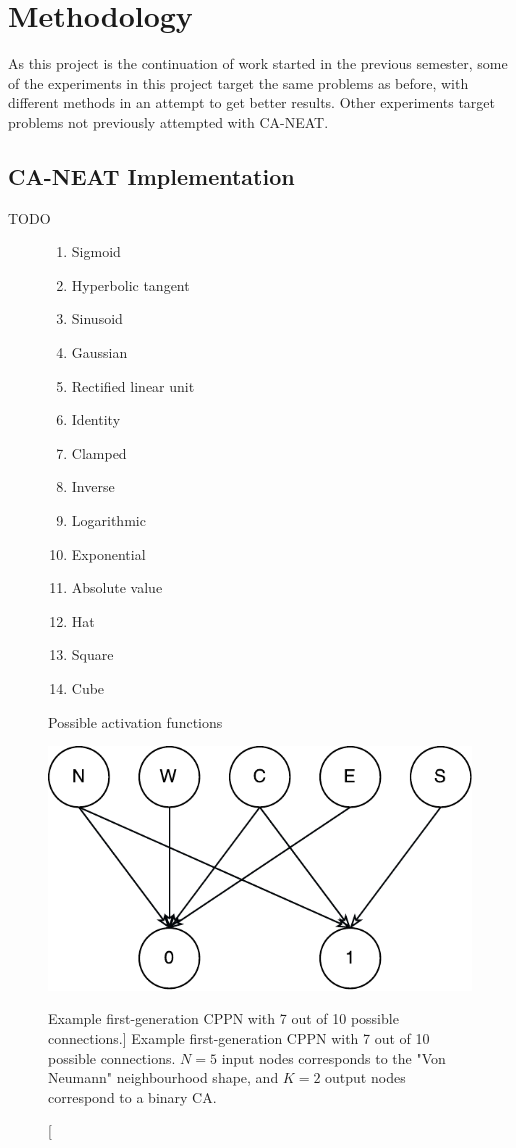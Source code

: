\chapter{Methodology}
\label{chap:methodology}

As this project is the continuation of work started in the previous semester,
some of the experiments in this project target the same problems as before,
with different methods in an attempt to get better results.
Other experiments target problems not previously attempted with CA-NEAT.

\section{CA-NEAT Implementation}
\label{sec:implementation}
TODO

\begin{figure}
\centering
\begin{multicols}{3}
\begin{enumerate}
    \item Sigmoid
    \item Hyperbolic tangent
    \item Sinusoid
    \item Gaussian
    \item Rectified linear unit
    \item Identity
    \item Clamped
    \item Inverse
    \item Logarithmic
    \item Exponential
    \item Absolute value
    \item Hat
    \item Square
    \item Cube
\end{enumerate}
\end{multicols}
\caption{Possible activation functions}
\label{fig:activations}
\end{figure}

\begin{figure}
\centering
\includegraphics[width=.5\columnwidth]{fig/single_layer_cppn}
\caption
[Example first-generation CPPN with 7 out of 10 possible connections.]
{Example first-generation CPPN with 7 out of 10 possible connections. $N=5$ input nodes corresponds to the "Von Neumann" neighbourhood shape, and $K=2$ output nodes correspond to a binary CA.}
\label{fig:single_layer_cppn}
\end{figure}

